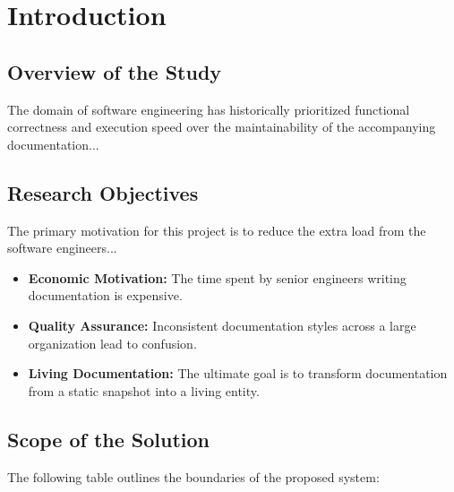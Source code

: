 \documentclass[12pt, a4paper]{report}
\begin{document}
\tableofcontents
\newpage

\chapter{Introduction}

\section{Overview of the Study}
The domain of software engineering has historically prioritized functional correctness and execution speed over the maintainability of the accompanying documentation...

\section{Research Objectives}
The primary motivation for this project is to reduce the extra load from the software engineers...
\begin{itemize}
    \item \textbf{Economic Motivation:} The time spent by senior engineers writing documentation is expensive.
    \item \textbf{Quality Assurance:} Inconsistent documentation styles across a large organization lead to confusion.
    \item \textbf{Living Documentation:} The ultimate goal is to transform documentation from a static snapshot into a living entity.
\end{itemize}

\section{Scope of the Solution}
The following table outlines the boundaries of the proposed system:
\end{document}
